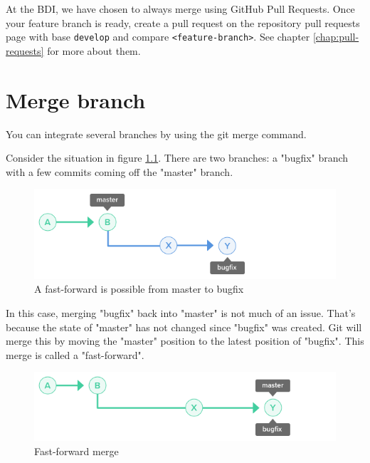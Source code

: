 \documentclass[10pt,a4paper,english]{report}
\begin{document}
    At the BDI, we have chosen to always merge using GitHub Pull Requests. Once your feature branch is ready, create a pull request on the repository pull requests page with base \verb|develop| and compare \verb|<feature-branch>|. See chapter \ref{chap:pull-requests} for more about them.

\chapter{Merge branch}
    \label{chap:merge-branch}

    You can integrate several branches by using the git merge command.

    Consider the situation in figure \ref{fig:bugfix-ff-possible}. There are two branches: a "bugfix" branch with a few commits coming off the "master" branch.

    \begin{figure}[ht]
    \begin{center}
    \includegraphics[scale=0.5]{images/merge_branch_001.png}
    \end{center}
    \caption{A fast-forward is possible from master to bugfix}
    \label{fig:bugfix-ff-possible}
    \end{figure}

    In this case, merging "bugfix" back into "master" is not much of an issue. That's because the state of "master" has not changed since "bugfix" was created. Git will merge this by moving the "master" position to the latest position of "bugfix". This merge is called a "fast-forward".

    \begin{figure}[ht]
    \begin{center}
    \includegraphics[scale=0.5]{images/merge_branch_002.png}
    \end{center}
    \caption{Fast-forward merge}
    \end{figure}
\end{document}
